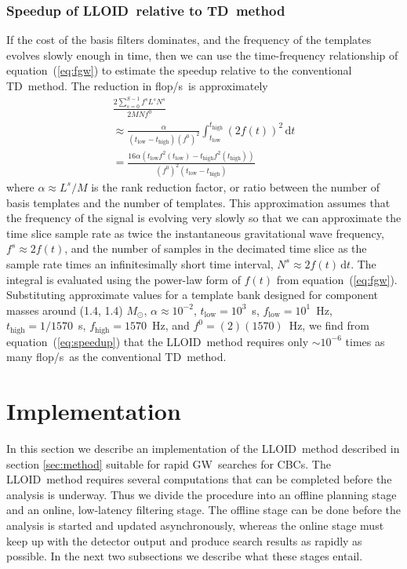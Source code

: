 \documentclass[preprint2]{aastex}
\newcommand{\GW}{GW}%
\newcommand{\CBC}{CBC}%
\newcommand{\tmpsamps}{\ensuremath{N}}
\newcommand{\numtmps}{\ensuremath{M}}
\newcommand{\svdtmps}[1]{\ensuremath{L^#1}}
\newcommand{\numsvdtmps}{\svdtmps{s}}
\newcommand{\slicesamps}[1]{\ensuremath{N^#1}}
\newcommand{\slicessamps}{\slicesamps{s}}
\newcommand{\flops}{flop/s}
\newcommand{\lloid}{LLOID}%
\newcommand{\TD}{TD}%
\begin{document}
\subsubsection{Speedup of \lloid\ relative to \TD\ method}

If the cost of the basis filters dominates, and the frequency of the templates
evolves slowly enough in time, then we can use the time-frequency relationship
of equation~(\ref{eq:fgw}) to estimate the speedup relative to the conventional
\TD\ method.  The reduction in \flops\ is approximately
%
\begin{multline*}
\label{eq:speedup}
\frac{2 \sum_{s=0}^{S-1} f^s \numsvdtmps \slicessamps}{2 \numtmps \tmpsamps f^0} \\
\approx \frac{\alpha}{\left(t_\mathrm{low} - t_\mathrm{high}\right) \left(f^0\right)^2} \int_{t_\mathrm{low}}^{t_\mathrm{high}} \left(2 f(t) \right)^2 \, \mathrm{d} t \\
= \frac{16 \alpha \left(t_\mathrm{low} f^2 (t_\mathrm{low}) - t_\mathrm{high} f^2 (t_\mathrm{high}) \right)}{\left(f^0\right)^2 \left(t_\mathrm{low} - t_\mathrm{high}\right)}
\end{multline*}
%
where $\alpha \approx \numsvdtmps / \numtmps$ is the rank reduction factor, or
ratio between the number of basis templates and the number of templates.  This
approximation assumes that the frequency of the signal is evolving very slowly
so that we can approximate the time slice sample rate as twice the instantaneous
gravitational wave frequency, $f^s \approx 2 f(t)$, and the number of samples in
the decimated time slice as the sample rate times an infinitesimally short time
interval, $\slicessamps \approx 2 f(t) \, \mathrm{d}t$. The integral is
evaluated using the power-law form of $f(t)$ from equation~(\ref{eq:fgw}).
Substituting approximate values for a template bank designed for component
masses around (1.4, 1.4) $M_\odot$, $\alpha \approx 10^{-2}$, $t_\mathrm{low} = 10^3$~s,
$f_\mathrm{low} = 10^1$~Hz, $t_\mathrm{high} = 1/1570$~s, $f_\mathrm{high} = 1570$~Hz,
and $f^0 = (2)(1570)$~Hz, we find from equation~(\ref{eq:speedup}) that the
\lloid\ method requires only $\sim 10^{-6}$ times as many \flops\ as the
conventional \TD\ method.

\section{Implementation}

In this section we describe an implementation of the \lloid\ method described
in section \ref{sec:method} suitable for rapid \GW\
searches for \CBC{}s.  The \lloid\ method requires several
computations that can be completed before the analysis is underway.  Thus
we divide the procedure into an offline planning stage and an
online, low-latency filtering stage.  The offline stage can be done before the
analysis is started and updated asynchronously, whereas the online stage must
keep up with the detector output and produce search results as rapidly as
possible.  In the next two subsections we describe what these stages entail.
\end{document}
